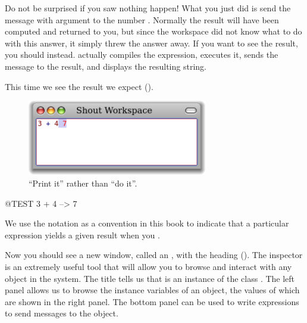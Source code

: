 \documentclass[a4paper,10pt,twoside]{book}
\begin{document}

Do not be surprised if you saw nothing happen! What you just did is send the message \ct{+} with argument  to the number . Normally the result  will have been computed and returned to you, but since the workspace did not know what to do with this answer, it simply threw the answer away.  If you want to see the result, you should  instead.  actually compiles the expression, executes it, sends the message  to the result, and displays the resulting string.

This time we see the result we expect ().

\begin{figure}[htb]
\centerline {\includegraphics[width=0.7\textwidth]{PrintIt}}
\caption{``Print it'' rather than ``do it''. \label{fig:printit}}
\end{figure}

\begin{code}{@TEST}
3 + 4 --> 7
\end{code}
\noindent
We use the notation \ct{-->} as a convention in this book to indicate that a particular \pharo expression yields a given result when you .

\noindent
Now you should see a new window, called an , with the heading  ().
The inspector is an extremely useful tool that will allow you to browse and interact with any object in the system.
The title tells us that  is an instance of the class .
The left panel allows us to browse the instance variables of an object, the values of which are shown in the right panel.
The bottom panel can be used to write expressions to send messages to the object.
\end{document}
